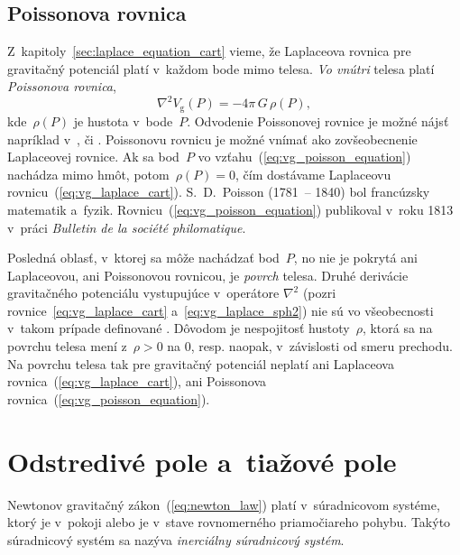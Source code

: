 \documentclass[a4paper, 12pt]{book}
\newcommand{\gidx}{\mathrm g}
\begin{document}
\subsection{Poissonova rovnica}
\label{sec:poisson_equation}

Z~kapitoly~\ref{sec:laplace_equation_cart} vieme, že Laplaceova rovnica pre
gravitačný potenciál platí v~každom bode mimo telesa.  \emph{Vo vnútri} telesa
platí \emph{Poissonova rovnica},
%
\begin{equation}
\label{eq:vg_poisson_equation}
\nabla^2 V_\gidx(P) = -4 \pi \, G \, \rho(P){,}
\end{equation}
%
kde~$\rho(P)$ je hustota v~bode~$P$.  Odvodenie Poissonovej rovnice je možné 
nájsť napríklad v~\textcite{MacMillan1930}, \textcite{Kellogg1967} či 
\textcite{SansoGeoidDetermination}.  Poissonovu rovnicu je možné vnímať ako 
zovšeobecnenie Laplaceovej rovnice.  Ak sa bod~$P$ vo 
vzťahu~(\ref{eq:vg_poisson_equation}) nachádza mimo hmôt, potom~$\rho(P) = 0$, 
čím dostávame Laplaceovu rovnicu~(\ref{eq:vg_laplace_cart}).  S.~D.~Poisson 
(1781~-- 1840) bol francúzsky matematik a~fyzik.  
Rovnicu~(\ref{eq:vg_poisson_equation}) publikoval v~roku 1813 v~práci 
\textit{Bulletin de la société philomatique}.

Posledná oblasť, v~ktorej sa môže nachádzať bod~$P$, no nie je pokrytá ani 
Laplaceovou, ani Poissonovou rovnicou, je \emph{povrch} telesa.  Druhé 
derivácie gravitačného potenciálu vystupujúce v~operátore $\nabla^2$ (pozri 
rovnice~\ref{eq:vg_laplace_cart} a~\ref{eq:vg_laplace_sph2}) nie sú vo 
všeobecnosti v~takom prípade definované \parencite{Kellogg1967}.  Dôvodom je 
nespojitosť hustoty~$\rho$, ktorá sa na povrchu telesa mení z~$\rho > 0$ na 0, 
resp. naopak, v~závislosti od smeru prechodu.  Na povrchu telesa tak pre 
gravitačný potenciál neplatí ani Laplaceova rovnica~(\ref{eq:vg_laplace_cart}), 
ani Poissonova rovnica~(\ref{eq:vg_poisson_equation}).






\section{Odstredivé pole a~tiažové pole}
\label{sec:centrifugal_gravity_field}

Newtonov gravitačný zákon~(\ref{eq:newton_law}) platí v~súradnicovom systéme,
ktorý je v~pokoji alebo je v~stave rovnomerného priamočiareho pohybu.  Takýto
súradnicový systém sa nazýva \emph{inerciálny súradnicový systém}.
\end{document}
